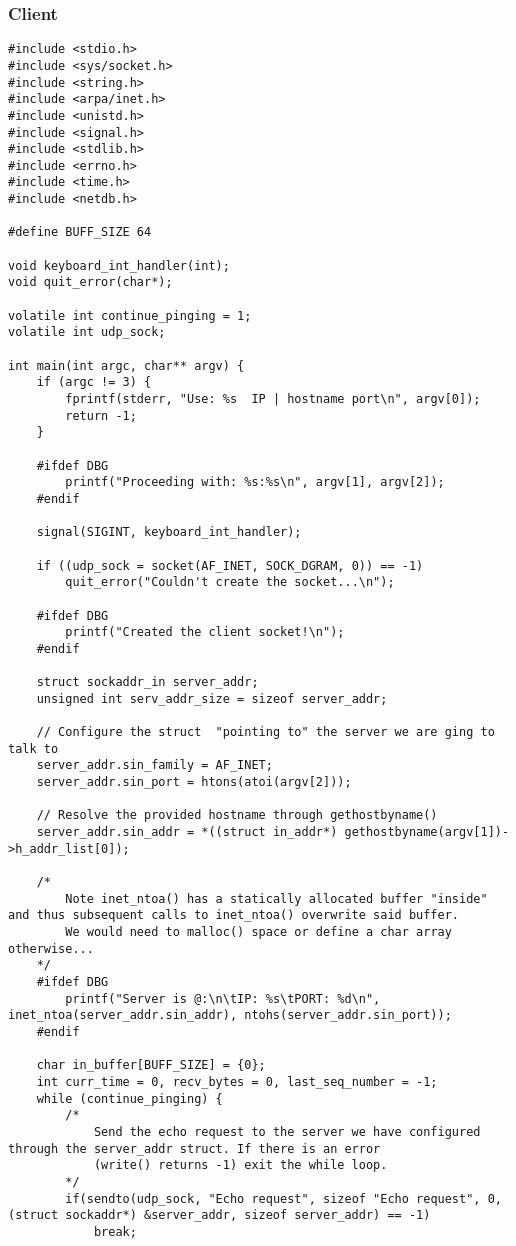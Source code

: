 \documentclass[landscape]{article}
\begin{document}
            \subsubsection{Client}
                \begin{verbatim}
#include <stdio.h>
#include <sys/socket.h>
#include <string.h>
#include <arpa/inet.h>
#include <unistd.h>
#include <signal.h>
#include <stdlib.h>
#include <errno.h>
#include <time.h>
#include <netdb.h>

#define BUFF_SIZE 64

void keyboard_int_handler(int);
void quit_error(char*);

volatile int continue_pinging = 1;
volatile int udp_sock;

int main(int argc, char** argv) {
    if (argc != 3) {
        fprintf(stderr, "Use: %s  IP | hostname port\n", argv[0]);
        return -1;
    }

    #ifdef DBG
        printf("Proceeding with: %s:%s\n", argv[1], argv[2]);
    #endif

    signal(SIGINT, keyboard_int_handler);

    if ((udp_sock = socket(AF_INET, SOCK_DGRAM, 0)) == -1)
        quit_error("Couldn't create the socket...\n");

    #ifdef DBG
        printf("Created the client socket!\n");
    #endif

    struct sockaddr_in server_addr;
    unsigned int serv_addr_size = sizeof server_addr;

    // Configure the struct  "pointing to" the server we are ging to talk to
    server_addr.sin_family = AF_INET;
    server_addr.sin_port = htons(atoi(argv[2]));

    // Resolve the provided hostname through gethostbyname()
    server_addr.sin_addr = *((struct in_addr*) gethostbyname(argv[1])->h_addr_list[0]);

    /*
        Note inet_ntoa() has a statically allocated buffer "inside" and thus subsequent calls to inet_ntoa() overwrite said buffer.
        We would need to malloc() space or define a char array otherwise...
    */
    #ifdef DBG
        printf("Server is @:\n\tIP: %s\tPORT: %d\n", inet_ntoa(server_addr.sin_addr), ntohs(server_addr.sin_port));
    #endif

    char in_buffer[BUFF_SIZE] = {0};
    int curr_time = 0, recv_bytes = 0, last_seq_number = -1;
    while (continue_pinging) {
        /*
            Send the echo request to the server we have configured through the server_addr struct. If there is an error
            (write() returns -1) exit the while loop.
        */
        if(sendto(udp_sock, "Echo request", sizeof "Echo request", 0, (struct sockaddr*) &server_addr, sizeof server_addr) == -1)
            break;


\end{verbatim}
\end{document}
